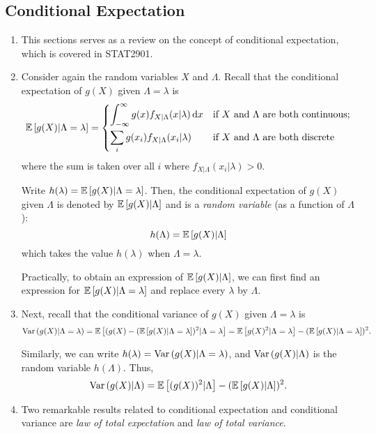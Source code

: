 \subsection{Conditional Expectation}
\begin{enumerate}
\item This sections serves as a review on the concept of conditional
expectation, which is covered in STAT2901.
\item Consider again the random variables \(X\) and \(\Lambda\). Recall that
the conditional expectation of \(g(X)\) given \(\Lambda=\lambda\) is
\[
\mathbb{E}\left[g(X)|\Lambda=\lambda\right]=
\begin{cases}
\displaystyle
\int_{-\infty}^{\infty}g(x)f_{X|\Lambda}(x|\lambda)\dd{x}&\text{if \(X\) and \(\Lambda\) are both continuous};\\
\displaystyle
\sum_{i}^{}g(x_i)f_{X|\Lambda}(x_i|\lambda)&\text{if \(X\) and \(\Lambda\) are both discrete}\\
\end{cases}
\]
where the sum is taken over all \(i\) where \(f_{X|\Lambda}(x_i|\lambda)>0\).

Write \(h(\lambda)=\mathbb{E}\left[g(X)|\Lambda=\lambda\right]\).  Then, the conditional
expectation of \(g(X)\) given \(\Lambda\) is denoted by \(\mathbb{E}\left[g(X)|\Lambda\right]\)
and is a \emph{random variable} (as a function of \(\Lambda\)):
\[
h(\Lambda)=\mathbb{E}\left[g(X)|\Lambda\right]
\]
which takes the value \(h(\lambda)\) when \(\Lambda=\lambda\).

\begin{note}
Practically, to obtain an expression of \(\mathbb{E}\left[g(X)|\Lambda\right]\), we can first
find an expression for \(\mathbb{E}\left[g(X)|\Lambda=\lambda\right]\) and replace every
\(\lambda\) by \(\Lambda\).
\end{note}
\item Next, recall that the conditional variance of \(g(X)\) given
\(\Lambda=\lambda\) is
\[
\operatorname{Var}\left(g(X)|\Lambda=\lambda\right)
=\mathbb{E}\left[(g(X)-(\mathbb{E}\left[g(X)|\Lambda=\lambda\right])^{2}|\Lambda=\lambda\right]
=\mathbb{E}\left[g(X)^2|\Lambda=\lambda\right]-(\mathbb{E}\left[g(X)|\Lambda=\lambda\right])^2.
\]
\begin{note}
Similarly, we can write \(h(\lambda)=\operatorname{Var}\left(g(X)|\Lambda=\lambda\right)\), and
\(\operatorname{Var}\left(g(X)|\Lambda\right)\) is the random variable \(h(\Lambda)\). Thus,
\[
\operatorname{Var}\left(g(X)|\Lambda\right)=\mathbb{E}\left[(g(X))^{2}|\Lambda\right]-(\mathbb{E}\left[g(X)|\Lambda\right])^{2}.
\]
\end{note}
\item Two remarkable results related to conditional expectation and conditional
variance are \emph{law of total expectation} and \emph{law of total variance}.


\end{enumerate}
